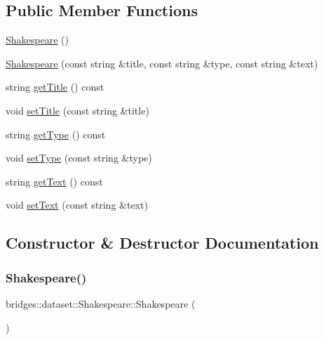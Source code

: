 \subsection*{Public Member Functions}
\begin{DoxyCompactItemize}
\item 
\hyperlink{classbridges_1_1dataset_1_1_shakespeare_a58ff458b70e8198b2e235eacd17be91c}{Shakespeare} ()
\item 
\hyperlink{classbridges_1_1dataset_1_1_shakespeare_a859f3625fb8019967aa8083f20993cad}{Shakespeare} (const string \&title, const string \&type, const string \&text)
\item 
string \hyperlink{classbridges_1_1dataset_1_1_shakespeare_a00ff743145899bf88435b194b6291ce7}{get\+Title} () const
\item 
void \hyperlink{classbridges_1_1dataset_1_1_shakespeare_a92c11a229b38913fea73cfe26474587b}{set\+Title} (const string \&title)
\item 
string \hyperlink{classbridges_1_1dataset_1_1_shakespeare_af0cc6fd91d90e663d343c52756e9f191}{get\+Type} () const
\item 
void \hyperlink{classbridges_1_1dataset_1_1_shakespeare_a4e9d1126524d2b10f5fe36ffd4588f15}{set\+Type} (const string \&type)
\item 
string \hyperlink{classbridges_1_1dataset_1_1_shakespeare_a23de5e2229cc15bb1c9f1eacaee007ee}{get\+Text} () const
\item 
void \hyperlink{classbridges_1_1dataset_1_1_shakespeare_af285363fb2bfe9cf302786ae31d4cc8c}{set\+Text} (const string \&text)
\end{DoxyCompactItemize}


\subsection{Constructor \& Destructor Documentation}
\mbox{\label{classbridges_1_1dataset_1_1_shakespeare_a58ff458b70e8198b2e235eacd17be91c}} 
\subsubsection{\texorpdfstring{Shakespeare()}{Shakespeare()}\hspace{0.1cm}{\footnotesize\ttfamily [1/2]}}
{\footnotesize\ttfamily bridges\+::dataset\+::\+Shakespeare\+::\+Shakespeare (\begin{DoxyParamCaption}{ }\end{DoxyParamCaption})\hspace{0.3cm}{\ttfamily [inline]}}

